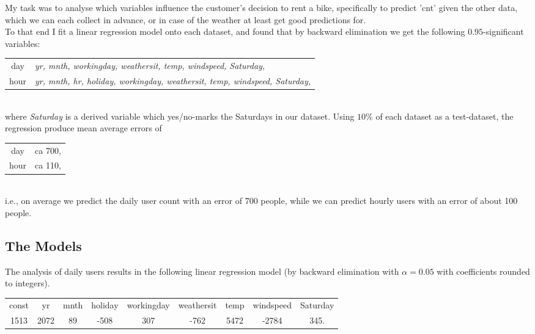 \documentclass[11pt,oneside,a4paper]{scrartcl} %
\begin{document}
My task was to analyse which variables influence the customer's decision to rent a bike,
specifically to predict 'cnt' given the other data, which we can each collect in advance,
or in case of the weather at least get good predictions for.\\[2 pt]

To that end I fit a linear regression model onto each dataset, and found that by
backward elimination we get the following $0.95$-significant variables:\\[2 pt]
\begin{adjustbox}{width = 1\textwidth}
\begin{tabular}{cl}
day& {\it yr, mnth, workingday, weathersit, temp, windspeed, Saturday,}\\
hour& {\it yr, mnth, hr, holiday, workingday, weathersit, temp, windspeed, Saturday,}\\
\end{tabular}\\[2pt]
\end{adjustbox}
where {\it Saturday} is a derived variable which yes/no-marks the Saturdays in our
dataset. Using $10\%$ of each dataset as a test-dataset, the regression produce
mean average errors of \\
\begin{tabular}{cc}
day&ca 700,\\
hour&ca 110,\\
\end{tabular}\\
i.e., on average we predict the daily user count with an error of 700 people, while
we can predict hourly users with an error of about 100 people. 

\subsection*{The Models}
The analysis of daily users results in the following linear regression model (by backward
elimination with $\alpha = 0.05$ with coefficients rounded to integers).\\[2pt]
\begin{adjustbox}{width = 1\textwidth}
\begin{tabular}{ccccccccc}
const & yr & mnth & holiday & workingday & weathersit & temp & windspeed & Saturday\\
1513 &2072 & 89 & -508 & 307& -762&5472 &-2784 & 345.\\
\end{tabular}
\end{adjustbox}\\[2pt]
\end{document}
